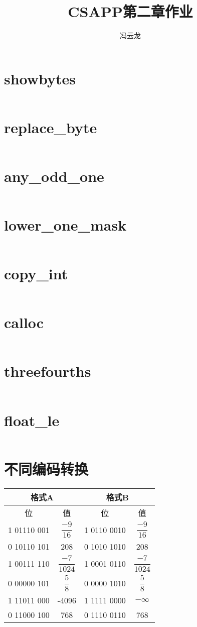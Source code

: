 \documentclass[11pt,a4paper]{ctexart}
\title{CSAPP第二章作业}
\author{冯云龙}
\begin{document}
\maketitle

\section{showbytes}
\inputminted{c}{src/2.56.c}

\section{replace\_byte}
\inputminted{c}{src/2.60.c}

\section{any\_odd\_one}
\inputminted{c}{src/2.64.c}

\section{lower\_one\_mask}
\inputminted{c}{src/2.68.c}

\section{copy\_int}
\inputminted{c}{src/2.72.c}

\section{calloc}
\inputminted{c}{src/2.76.c}

\section{threefourths}
\inputminted{c}{src/2.80.c}

\section{float\_le}
\inputminted{c}{src/2.84.c}

\section{不同编码转换}
\begin{tabular}{|c|c|c|c|}
	\hline 
	\multicolumn{2}{|c|}{格式A} & \multicolumn{2}{|c|}{格式B} \\ 
	\hline 
	位 & 值 & 位 & 值 \\ 
	\hline 
	1 01110 001 & $\dfrac{-9}{16}$ & 1 0110 0010 & $\dfrac{-9}{16}$ \\ 
	\hline 
	0 10110 101 & 208 & 0 1010 1010 & 208 \\ 
	\hline 
	1 00111 110 & $\dfrac{-7}{1024}$ & 1 0001 0110 & $\dfrac{-7}{1024}$ \\ 
	\hline 
	0 00000 101 & $\dfrac{5}{8}$ & 0 0000 1010 & $\dfrac{5}{8}$ \\ 
	\hline 
	1 11011 000 & -4096 & 1 1111 0000 & $-\infty $ \\ 
	\hline 
	0 11000 100 & 768 & 0 1110 0110 & 768 \\ 
	\hline 
\end{tabular} 
\end{document}
